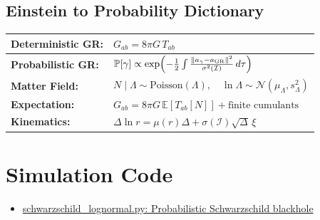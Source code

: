 \documentclass[11pt]{article}
\begin{document}
\subsection{Einstein to Probability Dictionary}
\begin{center}
\renewcommand{\arraystretch}{1.5}
\begin{tabular}{p{4cm} l}
\textbf{Deterministic GR:} & $G_{ab} = 8\pi G\,T_{ab}$ \\
\hline
\textbf{Probabilistic GR:} & $\mathbb{P}[\gamma] \propto \exp\!\left(-\frac{1}{2} \int \frac{\|a_\gamma-a_{\rm GR}\|^2}{\sigma^2(\mathcal{I})}\, d\tau\right)$ \\
\textbf{Matter Field:} & $N \mid \Lambda \sim \text{Poisson}(\Lambda), \quad \ln\Lambda \sim \mathcal{N}(\mu_\Lambda, s_\Lambda^2)$ \\
\textbf{Expectation:} & $G_{ab} = 8\pi G\,\mathbb{E}[T_{ab}[N]] + \text{finite cumulants}$ \\
\textbf{Kinematics:} & $\Delta \ln r = \mu(r)\Delta + \sigma(\mathcal{I})\sqrt{\Delta}\,\xi$ \\
\end{tabular}
\end{center}




\section*{Simulation Code}

\begin{itemize}
\item \href{simulations/schwarzschild\_lognormal.py}{schwarzschild\_lognormal.py: Probabilistic Schwarzschild blackhole}
\end{itemize}

\printbibliography
\end{document}
